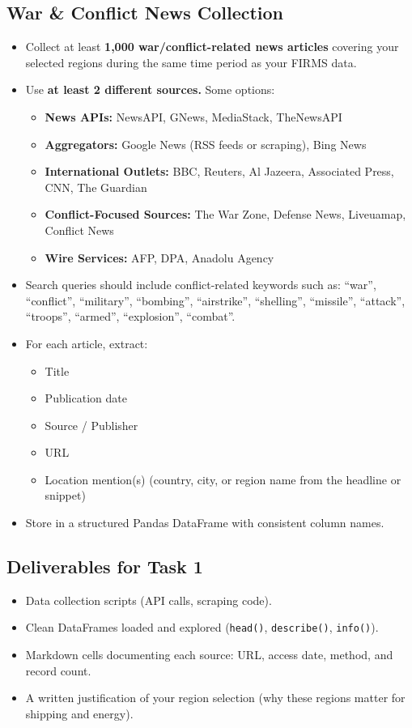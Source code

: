 \documentclass[11pt]{article}
\begin{document}
\subsection{War \& Conflict News Collection}
\begin{itemize}
  \item Collect at least \textbf{1,000 war/conflict-related news articles} covering your selected regions during the same time period as your FIRMS data.
  \item Use \textbf{at least 2 different sources.} Some options:
  \begin{itemize}
    \item \textbf{News APIs:} NewsAPI, GNews, MediaStack, TheNewsAPI
    \item \textbf{Aggregators:} Google News (RSS feeds or scraping), Bing News
    \item \textbf{International Outlets:} BBC, Reuters, Al Jazeera, Associated Press, CNN, The Guardian
    \item \textbf{Conflict-Focused Sources:} The War Zone, Defense News, Liveuamap, Conflict News
    \item \textbf{Wire Services:} AFP, DPA, Anadolu Agency
  \end{itemize}
  \item Search queries should include conflict-related keywords such as: ``war'', ``conflict'', ``military'', ``bombing'', ``airstrike'', ``shelling'', ``missile'', ``attack'', ``troops'', ``armed'', ``explosion'', ``combat''.
  \item For each article, extract:
  \begin{itemize}
    \item Title
    \item Publication date
    \item Source / Publisher
    \item URL
    \item Location mention(s) (country, city, or region name from the headline or snippet)
  \end{itemize}
  \item Store in a structured Pandas DataFrame with consistent column names.
\end{itemize}

\subsection{Deliverables for Task 1}
\begin{itemize}
  \item Data collection scripts (API calls, scraping code).
  \item Clean DataFrames loaded and explored (\texttt{head()}, \texttt{describe()}, \texttt{info()}).
  \item Markdown cells documenting each source: URL, access date, method, and record count.
  \item A written justification of your region selection (why these regions matter for shipping and energy).
\end{itemize}
\end{document}
